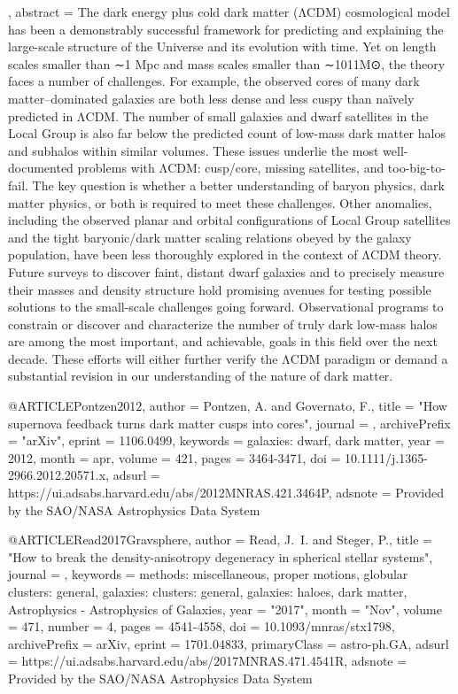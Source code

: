 \documentclass[apj]{emulateapj}
\begin{document}
{{{{{{}
,
    abstract = { The dark energy plus cold dark matter (ΛCDM) cosmological model has been a demonstrably successful framework for predicting and explaining the large-scale structure of the Universe and its evolution with time. Yet on length scales smaller than ∼1 Mpc and mass scales smaller than ∼1011M⊙, the theory faces a number of challenges. For example, the observed cores of many dark matter–dominated galaxies are both less dense and less cuspy than naïvely predicted in ΛCDM. The number of small galaxies and dwarf satellites in the Local Group is also far below the predicted count of low-mass dark matter halos and subhalos within similar volumes. These issues underlie the most well-documented problems with ΛCDM: cusp/core, missing satellites, and too-big-to-fail. The key question is whether a better understanding of baryon physics, dark matter physics, or both is required to meet these challenges. Other anomalies, including the observed planar and orbital configurations of Local Group satellites and the tight baryonic/dark matter scaling relations obeyed by the galaxy population, have been less thoroughly explored in the context of ΛCDM theory. Future surveys to discover faint, distant dwarf galaxies and to precisely measure their masses and density structure hold promising avenues for testing possible solutions to the small-scale challenges going forward. Observational programs to constrain or discover and characterize the number of truly dark low-mass halos are among the most important, and achievable, goals in this field over the next decade. These efforts will either further verify the ΛCDM paradigm or demand a substantial revision in our understanding of the nature of dark matter. }
}




@ARTICLE{Pontzen2012,
   author = {{Pontzen}, A. and {Governato}, F.},
    title = "{How supernova feedback turns dark matter cusps into cores}",
  journal = {\mnras},
archivePrefix = "arXiv",
   eprint = {1106.0499},
 keywords = {galaxies: dwarf, dark matter},
     year = 2012,
    month = apr,
   volume = 421,
    pages = {3464-3471},
      doi = {10.1111/j.1365-2966.2012.20571.x},
   adsurl = {https://ui.adsabs.harvard.edu/abs/2012MNRAS.421.3464P},
  adsnote = {Provided by the SAO/NASA Astrophysics Data System}
}





@ARTICLE{Read2017Gravsphere,
       author = {{Read}, J.~I. and {Steger}, P.},
        title = "{How to break the density-anisotropy degeneracy in spherical stellar systems}",
      journal = {\mnras},
     keywords = {methods: miscellaneous, proper motions, globular clusters: general, galaxies: clusters: general, galaxies: haloes, dark matter, Astrophysics - Astrophysics of Galaxies},
         year = "2017",
        month = "Nov",
       volume = {471},
       number = {4},
        pages = {4541-4558},
          doi = {10.1093/mnras/stx1798},
archivePrefix = {arXiv},
       eprint = {1701.04833},
 primaryClass = {astro-ph.GA},
       adsurl = {https://ui.adsabs.harvard.edu/abs/2017MNRAS.471.4541R},
      adsnote = {Provided by the SAO/NASA Astrophysics Data System}
}



}}}}
\end{document}
